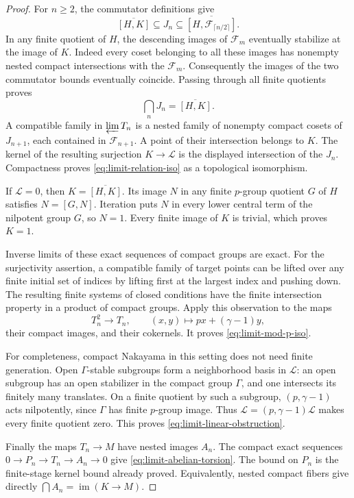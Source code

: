 \begin{proof}
For \(n\geq2\), the commutator definitions give
\[
 \overline{[H,K]}\subseteq J_n
 \subseteq\overline{[H,\mathcal F_{\lceil n/2\rceil}]}.
\]
In any finite quotient of \(H\), the descending images of
\(\mathcal F_m\) eventually stabilize at the image of \(K\).
Indeed every coset belonging to all these images has
nonempty nested compact intersections with the \(\mathcal F_m\).
Consequently the images of the two commutator bounds
eventually coincide. Passing through all finite quotients
proves
\[
                    \bigcap_nJ_n=\overline{[H,K]}.
\]
A compatible family in \(\varprojlim T_n\) is a nested family
of nonempty compact cosets of \(J_{n+1}\), each contained
in \(\mathcal F_{n+1}\). A point of their intersection belongs to
\(K\). The kernel of the resulting surjection
\(K\to\mathcal L\) is the displayed intersection of the
\(J_n\). Compactness proves
\eqref{eq:limit-relation-iso} as a topological isomorphism.

If \(\mathcal L=0\), then \(K=\overline{[H,K]}\).
Its image \(N\) in any finite \(p\)-group quotient \(G\)
of \(H\) satisfies \(N=[G,N]\). Iteration puts \(N\)
in every lower central term of the nilpotent group \(G\),
so \(N=1\). Every finite image of \(K\) is trivial,
which proves \(K=1\).

Inverse limits of these exact sequences of compact groups
are exact. For the surjectivity assertion, a compatible
family of target points can be lifted over any finite
initial set of indices by lifting first at the largest
index and pushing down. The resulting finite systems
of closed conditions have the finite intersection
property in a product of compact groups.
Apply this observation to the maps
\[
 T_n^2\longrightarrow T_n,\qquad
 (x,y)\longmapsto px+(\gamma-1)y,
\]
their compact images, and their cokernels. It proves
\eqref{eq:limit-mod-p-iso}.

For completeness, compact Nakayama in this setting does
not need finite generation. Open \(\Gamma\)-stable
subgroups form a neighborhood basis in \(\mathcal L\):
an open subgroup has an open stabilizer in the compact
group \(\Gamma\), and one intersects its finitely many
translates. On a finite quotient by such a subgroup,
\((p,\gamma-1)\) acts nilpotently, since \(\Gamma\)
has finite \(p\)-group image. Thus
\(\mathcal L=(p,\gamma-1)\mathcal L\) makes every
finite quotient zero. This proves
\eqref{eq:limit-linear-obstruction}.

Finally the maps \(T_n\to M\) have nested images \(A_n\).
The compact exact sequences
\(0\to P_n\to T_n\to A_n\to0\) give
\eqref{eq:limit-abelian-torsion}. The bound on \(P_n\)
is the finite-stage kernel bound already proved.
Equivalently, nested compact fibers give directly
\(\bigcap A_n=\operatorname{im}(K\to M)\).
\end{proof}

